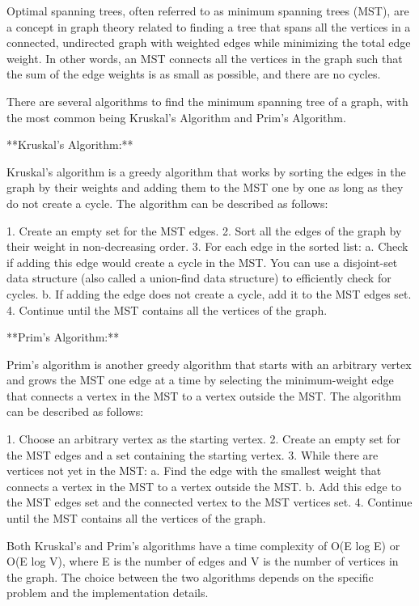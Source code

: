 \documentclass{article}
\begin{document}
Optimal spanning trees, often referred to as minimum spanning trees (MST), are a concept in graph theory related to finding a tree that spans all the vertices in a connected, undirected graph with weighted edges while minimizing the total edge weight. In other words, an MST connects all the vertices in the graph such that the sum of the edge weights is as small as possible, and there are no cycles.

There are several algorithms to find the minimum spanning tree of a graph, with the most common being Kruskal's Algorithm and Prim's Algorithm.

**Kruskal's Algorithm:**

Kruskal's algorithm is a greedy algorithm that works by sorting the edges in the graph by their weights and adding them to the MST one by one as long as they do not create a cycle. The algorithm can be described as follows:

1. Create an empty set for the MST edges.
2. Sort all the edges of the graph by their weight in non-decreasing order.
3. For each edge in the sorted list:
   a. Check if adding this edge would create a cycle in the MST. You can use a disjoint-set data structure (also called a union-find data structure) to efficiently check for cycles.
   b. If adding the edge does not create a cycle, add it to the MST edges set.
4. Continue until the MST contains all the vertices of the graph.

**Prim's Algorithm:**

Prim's algorithm is another greedy algorithm that starts with an arbitrary vertex and grows the MST one edge at a time by selecting the minimum-weight edge that connects a vertex in the MST to a vertex outside the MST. The algorithm can be described as follows:

1. Choose an arbitrary vertex as the starting vertex.
2. Create an empty set for the MST edges and a set containing the starting vertex.
3. While there are vertices not yet in the MST:
   a. Find the edge with the smallest weight that connects a vertex in the MST to a vertex outside the MST.
   b. Add this edge to the MST edges set and the connected vertex to the MST vertices set.
4. Continue until the MST contains all the vertices of the graph.

Both Kruskal's and Prim's algorithms have a time complexity of O(E log E) or O(E log V), where E is the number of edges and V is the number of vertices in the graph. The choice between the two algorithms depends on the specific problem and the implementation details.
\end{document}
